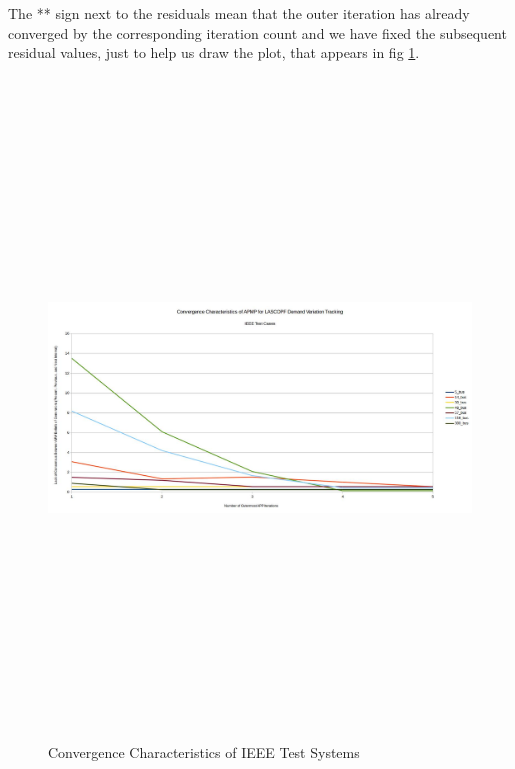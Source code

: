 \documentclass[preprint,12pt,3p]{elsarticle}
\begin{document}
\begin{table}[ht]
		\label{table:ConvergenceChar} %
		
	\end{table}
	The ** sign next to the residuals mean that the outer iteration has already converged by the corresponding iteration count and we have fixed the subsequent residual values, just to help us draw the plot, that appears in fig \ref{SummaryConv}. 
	\begin{figure}
		\begin{center}
			\includegraphics[height=17.5cm,width=21cm, angle=90]{N-1_SCOPF_Summary_Improved.jpg} %
			\caption{Convergence Characteristics of IEEE Test Systems}
			\label{SummaryConv}
		\end{center}
	\end{figure}
\end{document}
